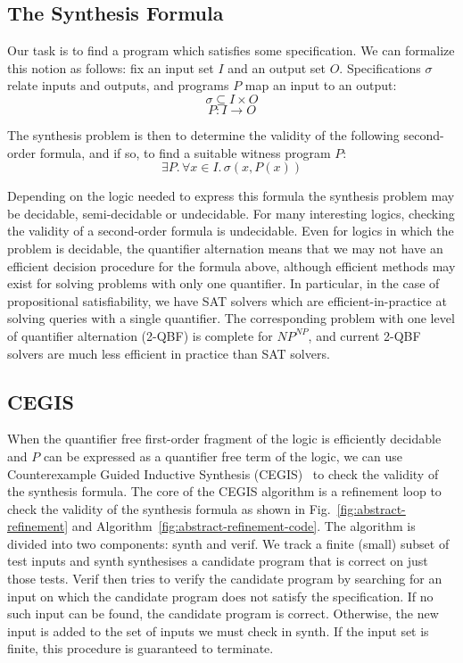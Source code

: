 \documentclass[a4paper]{llncs}
\begin{document}
\subsection{The Synthesis Formula}
\label{sec:abstract-formula}

Our task is to find a program which satisfies some specification.  We can formalize this
notion as follows: fix an input set $I$ and an output set $O$.  Specifications $\sigma$
relate inputs and outputs, and programs $P$ map an input to an output:
%
$$ \sigma \subseteq I \times O $$
$$ P : I \rightarrow O$$

The synthesis problem is then to determine the validity of the following
second-order formula, and if so, to find a suitable witness program $P$:
%
$$\exists P .\, \forall x \in I.\, \sigma(x, P(x))$$

Depending on the logic needed to express this formula the synthesis problem
may be decidable, semi-decidable or undecidable.  For many interesting
logics, checking the validity of a second-order formula is undecidable. 
Even for logics in which the problem is decidable, the quantifier
alternation means that we may not have an efficient decision procedure for
the formula above, although efficient methods may exist for solving problems
with only one quantifier.  In particular, in the case of propositional
satisfiability, we have SAT solvers which are efficient-in-practice at
solving queries with a single quantifier.  The corresponding problem with
one level of quantifier alternation (2-QBF) is complete for $NP^{NP}$, and
current 2-QBF solvers are much less efficient in practice than SAT solvers.

\subsection{CEGIS}

When the quantifier free first-order fragment of the logic is efficiently decidable and
$P$ can be expressed as a quantifier free term of the logic, we can use
Counterexample Guided Inductive Synthesis (CEGIS)~\cite{lezama-thesis,sketch} to
check the validity of the synthesis formula.  The core of the CEGIS algorithm is
a refinement loop to check the
validity of the synthesis formula as shown in Fig.~\ref{fig:abstract-refinement} and
Algorithm~\ref{fig:abstract-refinement-code}.  The algorithm is divided into two
components: {\sc synth} and {\sc verif}.  We track a finite (small) subset of test inputs
and {\sc synth} synthesises a candidate program that is correct on just those tests.
{\sc Verif} then tries to verify the candidate program by searching for an input on
which the candidate program does not satisfy the specification.  If no such input
can be found, the candidate program is correct.  Otherwise, the new input is added
to the set of inputs we must check in {\sc synth}.  If the input set is finite, this
procedure is guaranteed to terminate.
\end{document}

